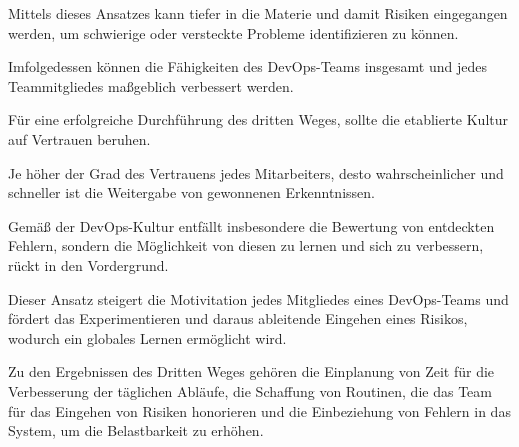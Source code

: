 Mittels dieses Ansatzes kann tiefer in die Materie und damit Risiken eingegangen werden, um schwierige oder versteckte Probleme identifizieren zu können. 

Imfolgedessen können die Fähigkeiten des DevOps-Teams insgesamt und jedes Teammitgliedes maßgeblich verbessert werden.

Für eine erfolgreiche Durchführung des dritten Weges, sollte die etablierte Kultur auf Vertrauen beruhen. 

Je höher der Grad des Vertrauens jedes Mitarbeiters, desto wahrscheinlicher und schneller ist die Weitergabe von gewonnenen Erkenntnissen.

Gemäß der DevOps-Kultur entfällt insbesondere die Bewertung von entdeckten Fehlern, sondern die Möglichkeit von diesen zu lernen und sich zu verbessern, rückt in den Vordergrund. 

Dieser Ansatz steigert die Motivitation jedes Mitgliedes eines DevOps-Teams und fördert das Experimentieren und daraus ableitende Eingehen eines Risikos, wodurch ein globales Lernen ermöglicht wird. 

Zu den Ergebnissen des Dritten Weges gehören die Einplanung von Zeit für die Verbesserung der täglichen Abläufe, die Schaffung von Routinen, die das Team für das Eingehen von Risiken honorieren und die Einbeziehung von Fehlern in das System, um die Belastbarkeit zu erhöhen.


